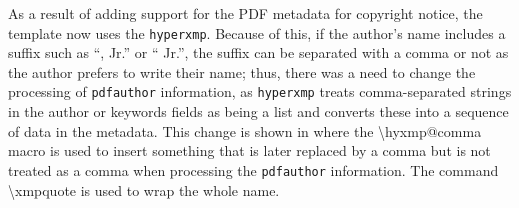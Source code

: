 As a result of adding support for the PDF metadata for copyright notice, the template now uses the \texttt{hyperxmp}. Because of this, if the author's name includes a suffix such as ``, Jr.'' or `` Jr.'', \ie the suffix can be separated with a comma or not as the author prefers to write their name; thus, there was a need to change the processing of \texttt{pdfauthor} information, as \texttt{hyperxmp} treats comma-separated strings in the author or keywords fields as being a list and converts these into a sequence of data in the metadata. This change is shown in  where the \textbackslash hyxmp@comma macro is used to insert something that is later replaced by a comma but is not treated as a comma when processing the \texttt{pdfauthor} information. The command \textbackslash xmpquote is used to wrap the whole name.
